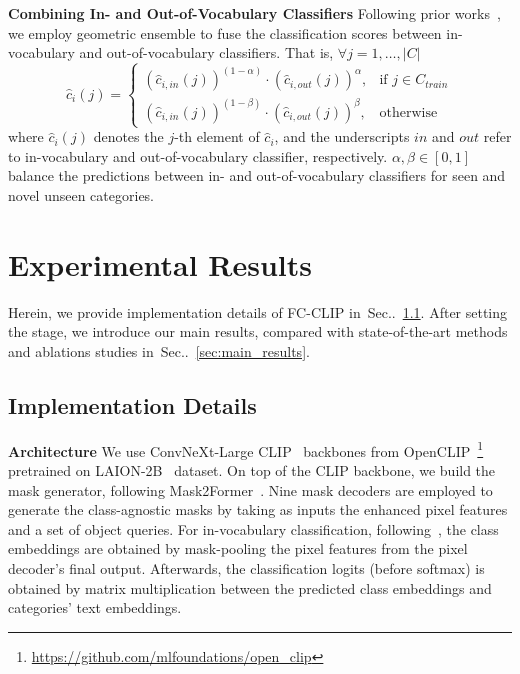 \documentclass{article}
\makeatletter
\DeclareRobustCommand\onedot{\futurelet\@let@token\@onedot}
\def\@onedot{\ifx\@let@token.\else.\null\fi\xspace}
\newcommand{\secref}[1]{Sec\onedot~\ref{#1}}
\newcommand{\modelname}{FC-CLIP\xspace}
\makeatother
\begin{document}
\noindent \textbf{Combining In- and Out-of-Vocabulary Classifiers}\quad
Following prior works~\cite{gu2021open,ghiasi2022scaling,kuo2022f,xu2023open}, we employ geometric ensemble to fuse the classification scores between in-vocabulary and out-of-vocabulary classifiers.
That is, $\forall j=1, \dots, |C|$
\begin{equation}
\label{equ:geometric_ensemble}
\hat{c}_{i}(j) = \begin{cases}
    (\hat{c}_{i, in}(j))^{(1-\alpha)} \cdot (\hat{c}_{i, out}(j))^\alpha, & \text{if } j \in C_{train}\\
    (\hat{c}_{i, in}(j))^{(1-\beta)} \cdot (\hat{c}_{i, out}(j))^\beta, & \text{otherwise }
\end{cases}
\end{equation}
where $\hat{c}_i(j)$ denotes the $j$-th element of $\hat{c}_i$, and the underscripts $in$ and $out$ refer to in-vocabulary and out-of-vocabulary classifier, respectively. $\alpha, \beta \in [0, 1]$ balance the predictions between in- and out-of-vocabulary classifiers for seen and novel unseen categories. \section{Experimental Results}
\label{sec:experiments}
Herein, we provide implementation details of \modelname in~\secref{sec:implementation}.
After setting the stage, we introduce our main results, compared with state-of-the-art methods and ablations studies in~\secref{sec:main_results}.


\subsection{Implementation Details}
\label{sec:implementation}
\noindent \textbf{Architecture}\quad
We use ConvNeXt-Large CLIP~\cite{liu2022convnet,radford2021learning} backbones from OpenCLIP~\cite{ilharco_gabriel_2021_5143773}\footnote{\url{https://github.com/mlfoundations/open_clip}} pretrained on LAION-2B~\cite{schuhmann2022laion} dataset.
On top of the CLIP backbone, we build the mask generator, following Mask2Former~\cite{cheng2021masked}.
Nine mask decoders are employed to generate the class-agnostic masks by taking as inputs the enhanced pixel features and a set of object queries.
For in-vocabulary classification, following~\cite{ghiasi2022scaling}, the class embeddings are obtained by mask-pooling the pixel features from the pixel decoder's final output.
Afterwards, the classification logits (before softmax) is obtained by matrix multiplication between the predicted class embeddings and categories' text embeddings.
\end{document}
